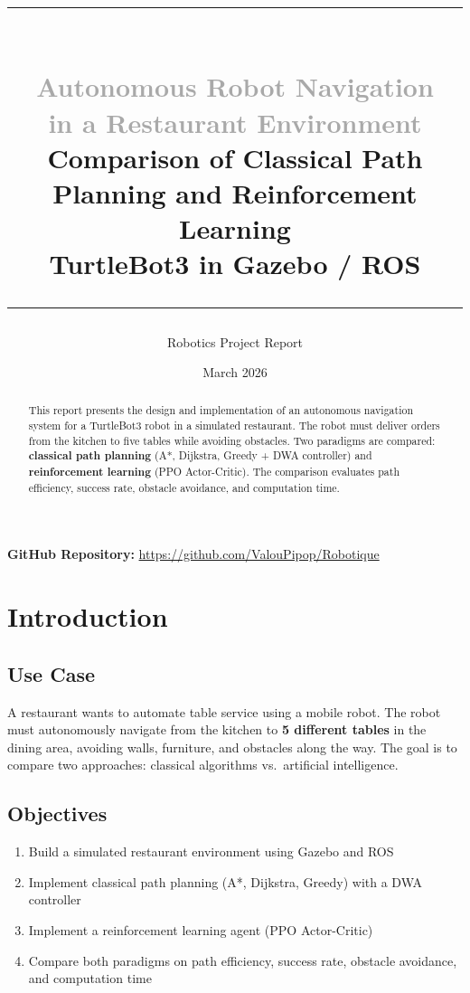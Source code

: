 \documentclass[12pt, a4paper]{article}
\title{
  \vspace{-1cm}
  {\color{primaryblue}\rule{\textwidth}{2pt}} \\[0.3cm]
  \textbf{\textcolor{darkgray}{Autonomous Robot Navigation\\in a Restaurant Environment}} \\[0.4cm]
  \large\textcolor{primaryblue}{Comparison of Classical Path Planning and Reinforcement Learning} \\
  \large\textcolor{accentgreen}{TurtleBot3 in Gazebo / ROS} \\[0.2cm]
  {\color{primaryblue}\rule{\textwidth}{2pt}}
}
\author{Robotics Project Report}
\date{March 2026}
\begin{document}
\maketitle
\thispagestyle{fancy}

\begin{center}
\large\textcolor{primaryblue}{\textbf{GitHub Repository:}} \url{https://github.com/ValouPipop/Robotique}
\end{center}
\vspace{0.3cm}

\begin{abstract}
This report presents the design and implementation of an autonomous navigation system for a TurtleBot3 robot in a simulated restaurant. The robot must deliver orders from the kitchen to five tables while avoiding obstacles. Two paradigms are compared: \textbf{classical path planning} (A*, Dijkstra, Greedy + DWA controller) and \textbf{reinforcement learning} (PPO Actor-Critic). The comparison evaluates path efficiency, success rate, obstacle avoidance, and computation time.
\end{abstract}

\tableofcontents
\newpage

\section{Introduction}

\subsection{Use Case}

\begin{tcolorbox}[colback=lightblue, colframe=primaryblue, title=\textbf{Use Case: Restaurant Robot Waiter}]
A restaurant wants to automate table service using a mobile robot. The robot must autonomously navigate from the kitchen to \textbf{5 different tables} in the dining area, avoiding walls, furniture, and obstacles along the way. The goal is to compare two approaches: classical algorithms vs.\ artificial intelligence.
\end{tcolorbox}

\subsection{Objectives}
\begin{enumerate}
  \item Build a simulated restaurant environment using Gazebo and ROS
  \item Implement classical path planning (A*, Dijkstra, Greedy) with a DWA controller
  \item Implement a reinforcement learning agent (PPO Actor-Critic)
  \item Compare both paradigms on path efficiency, success rate, obstacle avoidance, and computation time
\end{enumerate}
\end{document}
